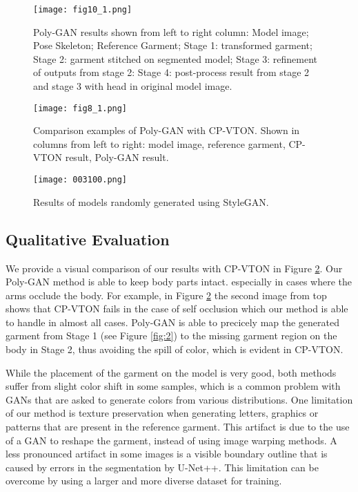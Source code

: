 \documentclass[11pt]{article}
\begin{document}
\begin{figure}
 \begin{center}
 
  \texttt{[image: fig10\_1.png]}
\caption{Poly-GAN results shown from left to right column: Model image; Pose Skeleton; Reference Garment; Stage 1: transformed garment; Stage 2: garment stitched on segmented model; Stage 3: refinement of outputs from stage 2: Stage 4: post-process result from stage 2 and stage 3 with head in original model image. }
  \label{fig:6}
 \end{center}
\end{figure}

\begin{figure}
 \begin{center}
 \texttt{[image: fig8\_1.png]}
 \caption{Comparison examples of Poly-GAN with CP-VTON. Shown in columns from left to right: model image, reference garment, CP-VTON result, Poly-GAN result. }
 \label{fig:8}
\end{center}
\end{figure}
\begin{figure}
  \texttt{[image: 003100.png]}
  \caption{Results of models randomly generated using StyleGAN.}
  \label{fig:7}
\end{figure}
\subsection{Qualitative Evaluation}
We provide a visual comparison of our results with CP-VTON in Figure \ref{fig:8}. 
Our Poly-GAN method is able to keep body parts intact. especially in cases where the arms occlude the body. 
For example, in Figure \ref{fig:8} the second image from top shows that CP-VTON fails in the case of self occlusion which our method is able to handle in almost all cases. Poly-GAN is able to precicely map the generated garment from Stage 1 (see Figure \ref{fig:2}) to the missing garment region on the body in Stage 2, thus avoiding the spill of color, which is evident in CP-VTON.

While the placement of the garment on the model is very good, 
both methods suffer from slight color shift in some samples, 
which is a common problem with GANs that are asked to generate colors from various distributions.
One limitation of our method is texture preservation when generating letters, graphics or patterns that are present in the reference garment. This artifact is due to the use of a GAN to reshape the garment, instead of using image warping methods. A less pronounced artifact in some images is a visible boundary outline that is caused by errors in the segmentation by U-Net++. This limitation can be overcome by using a larger and more diverse dataset for training.
\end{document}

